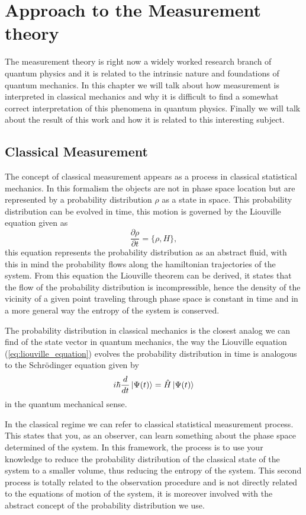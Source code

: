 \chapter{Approach to the Measurement theory}
The measurement theory is right now a widely worked research branch of quantum physics and it is related to the intrinsic nature and foundations of quantum mechanics. In this chapter we will talk about how measurement is interpreted in classical mechanics and why it is difficult to find a somewhat correct interpretation of this phenomena in quantum physics. Finally we will talk about the result of this work and how it is related to this interesting subject.
\section{Classical Measurement}
The concept of classical measurement appears as a process in classical statistical mechanics. In this formalism the objects are not in phase space location but are represented by a probability distribution $\rho$ as a state in space.  This probability distribution can be evolved in time, this motion is governed by the Liouville equation given as 
\begin{equation}
	\frac{\partial \rho}{\partial t}=\{ \rho,H\},
	\label{eq:liouville_equation}
\end{equation}
this equation represents the probability distribution as an abstract fluid, with this in mind the probability flows along the hamiltonian trajectories of the system. From this equation the Liouville theorem can be derived, it states that the flow of the probability distribution is incompressible, hence the density of the vicinity of a given point traveling through phase space is constant in time and in a more general way the entropy of the system is conserved.\par

The probability distribution in classical mechanics is the closest analog we can find of the state vector in quantum mechanics, the way the Liouville equation (\ref{eq:liouville_equation}) evolves the probability distribution in time is analogous to the Schrödinger equation given by
\begin{equation}
	i\hbar \frac{d }{dt}\ket{\Psi(t)}=\hat{H}\ket{\Psi(t)}
	\label{eq:schrodinger_equation}
\end{equation}
in the quantum mechanical sense. \par 
In the classical regime we can refer to classical statistical measurement process. This states that you, as an observer, can learn something about the phase space determined of the system. In this framework, the process is to use your knowledge to reduce the probability distribution of the classical state of the system to a smaller volume, thus reducing the entropy of the system. This second process is totally related to the observation procedure and is not directly related to the equations of motion of the system, it is moreover involved with the abstract concept of the probability distribution we use.\par

